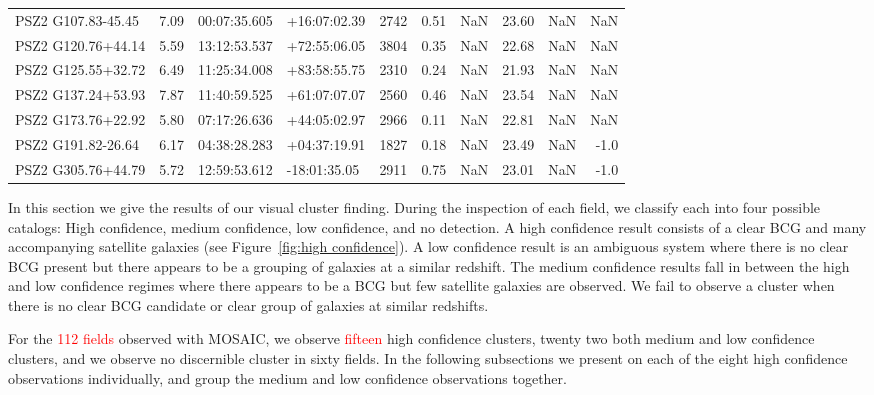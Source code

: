 \documentclass[apj, revtex4-1]{emulateapj}
\newcommand{\editorial}[1]{\textcolor{red}{#1}}
\begin{document}
\begin{table}
\begin{tabular}{lrlllrrrrr}
 PSZ2 G107.83-45.45 & 7.09 &  00:07:35.605 &  +16:07:02.39 &      2742 &        0.51 &    NaN &   23.60 &       NaN &              NaN \\
 PSZ2 G120.76+44.14 & 5.59 &  13:12:53.537 &  +72:55:06.05 &      3804 &        0.35 &    NaN &   22.68 &       NaN &              NaN \\
 PSZ2 G125.55+32.72 & 6.49 &  11:25:34.008 &  +83:58:55.75 &      2310 &        0.24 &    NaN &   21.93 &       NaN &              NaN \\
 PSZ2 G137.24+53.93 & 7.87 &  11:40:59.525 &  +61:07:07.07 &      2560 &        0.46 &    NaN &   23.54 &       NaN &              NaN \\
 PSZ2 G173.76+22.92 & 5.80 &  07:17:26.636 &  +44:05:02.97 &      2966 &        0.11 &    NaN &   22.81 &       NaN &              NaN \\
 PSZ2 G191.82-26.64 & 6.17 &  04:38:28.283 &  +04:37:19.91 &      1827 &        0.18 &    NaN &   23.49 &       NaN &             -1.0 \\
 PSZ2 G305.76+44.79 & 5.72 &  12:59:53.612 &  -18:01:35.05 &      2911 &        0.75 &    NaN &   23.01 &       NaN &             -1.0 \\
 	\hline
	\end{tabular}
\label{tbl:results}
\end{table}

In this section we give the results of our visual cluster finding. During the inspection of each field, we classify each into four possible catalogs: High confidence, medium confidence, low confidence, and no detection. A high confidence result consists of a clear BCG and many accompanying satellite galaxies (see Figure~\ref{fig:high confidence}). A low confidence result is an ambiguous system where there is no clear BCG present but there appears to be a grouping of galaxies at a similar redshift. The medium confidence results fall in between the high and low confidence regimes where there appears to be a BCG but few satellite galaxies are observed. We fail to observe a cluster when there is no clear BCG candidate or clear group of galaxies at similar redshifts.

For the \editorial{112 fields} observed with MOSAIC, we observe \editorial{fifteen} high confidence clusters, twenty two both medium and low confidence clusters, and we observe no discernible cluster in sixty fields. In the following subsections we present on each of the eight high confidence observations individually, and group the medium and low confidence observations together.
\end{document}
